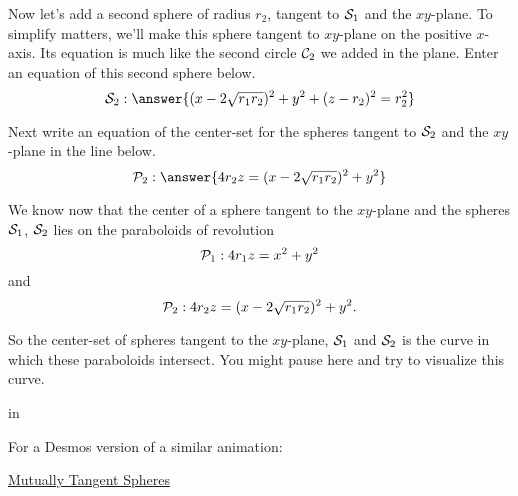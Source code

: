 \documentclass{ximera}
\newcommand{\pskip}{\vskip 0.1 in}
\begin{document}
\begin{question}  \label{Q365434:Spheres}
Now let's add a second sphere of radius $r_2$, tangent to ${\cal S}_1$ and the $xy$-plane. To simplify matters, we'll make this sphere tangent to $xy$-plane on the positive $x$-axis. Its equation is much like the second circle ${\cal C}_2$ we added in the plane. Enter an equation of this second sphere below.
\[
   {\cal S}_2: \answer{(x-2\sqrt{r_1r_2})^2 + y^2 + (z-r_2)^2 = r_2^2}
\]

Next write an equation of the center-set for the spheres tangent to ${\cal S}_2$ and the $xy$-plane in the line below.
\[
   {\cal P}_2:  \answer{4r_2z = (x-2\sqrt{r_1r_2})^2 + y^2}
\]

\end{question}


\begin{exploration}  
We know now that the center of a sphere tangent to the $xy$-plane and the spheres ${\cal S}_1$, ${\cal S}_2$ lies on the paraboloids of revolution
\[
   {\cal P}_1:  4 r_1z  = x^2 + y^2
\]
and 
\[
     {\cal P}_2:  4r_2z = (x-2\sqrt{r_1r_2})^2 + y^2 .
\]

So the center-set of spheres tangent to the $xy$-plane, ${\cal S}_1$ and ${\cal S}_2$ is the curve in which these paraboloids intersect. You might pause here and try to visualize this curve.

 
\begin{onlineOnly}
    \begin{center}
\end{center}
\end{onlineOnly}


\end{exploration}

 
\begin{onlineOnly}
    \begin{center}
\end{center}
\end{onlineOnly}


\pskip
 
For a Desmos version of a similar animation:

\href{https://www.desmos.com/3d/7fb88aea41}{Mutually Tangent Spheres}
\end{document}
